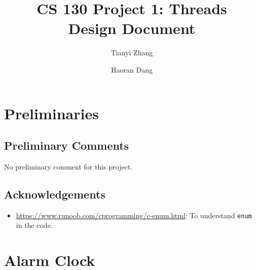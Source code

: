 \documentclass[sigconf, nonacm]{acmart}
\begin{document}
    \title{CS 130 Project 1: Threads\\Design Document}

    \author{Tianyi Zhang}

    \author{Haoran Dang}

    \maketitle

    \setcounter{section}{-1}

    \section{Preliminaries}
        \subsection{Preliminary Comments}

        No preliminary comment for this project. 

        \subsection{Acknowledgements}
        
            \begin{itemize}
                \item \url{https://www.runoob.com/cprogramming/c-enum.html}: To understand \texttt{enum} in the code. 
            \end{itemize} 
    
    \section{Alarm Clock}
            
\end{document}
